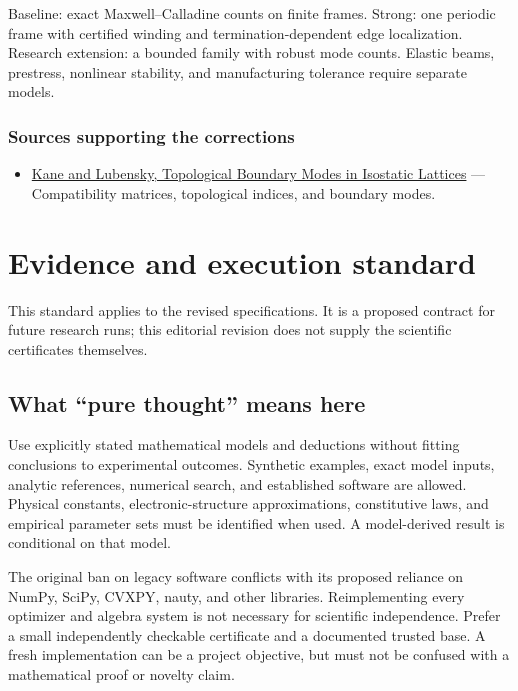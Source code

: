 \documentclass[
  11pt,
]{article}
\providecommand{\tightlist}{%
  \setlength{\itemsep}{0pt}\setlength{\parskip}{0pt}}
\begin{document}
Baseline: exact Maxwell--Calladine counts on finite frames. Strong: one
periodic frame with certified winding and termination-dependent edge
localization. Research extension: a bounded family with robust mode
counts. Elastic beams, prestress, nonlinear stability, and manufacturing
tolerance require separate models.

\subsubsection{Sources supporting the corrections}

\begin{itemize}
\tightlist
\item
  \href{https://arxiv.org/abs/1308.0554}{Kane and Lubensky, Topological
  Boundary Modes in Isostatic Lattices} --- Compatibility matrices,
  topological indices, and boundary modes.
\end{itemize}

\section{Evidence and execution standard}

This standard applies to the revised specifications. It is a proposed
contract for future research runs; this editorial revision does not
supply the scientific certificates themselves.

\subsection{What ``pure thought'' means here}

Use explicitly stated mathematical models and deductions without fitting
conclusions to experimental outcomes. Synthetic examples, exact model
inputs, analytic references, numerical search, and established software
are allowed. Physical constants, electronic-structure approximations,
constitutive laws, and empirical parameter sets must be identified when
used. A model-derived result is conditional on that model.

The original ban on legacy software conflicts with its proposed reliance
on NumPy, SciPy, CVXPY, nauty, and other libraries. Reimplementing every
optimizer and algebra system is not necessary for scientific
independence. Prefer a small independently checkable certificate and a
documented trusted base. A fresh implementation can be a project
objective, but must not be confused with a mathematical proof or novelty
claim.
\end{document}
